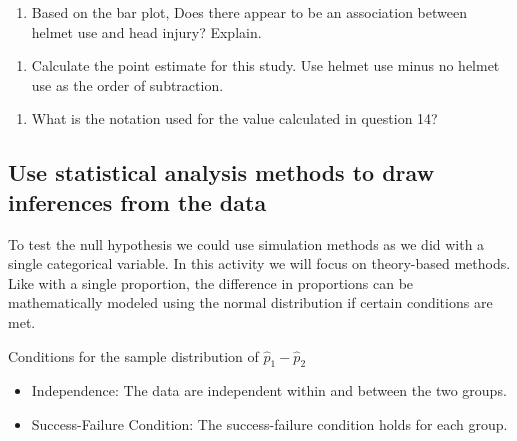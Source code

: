 \documentclass[
]{report}
\providecommand{\tightlist}{%
  \setlength{\itemsep}{0pt}\setlength{\parskip}{0pt}}
\begin{document}
\vspace{0.1in}

\begin{enumerate}
\def\labelenumi{\arabic{enumi}.}
\setcounter{enumi}{12}
\tightlist
\item
  Based on the bar plot, Does there appear to be an association between helmet use and head injury? Explain.
\end{enumerate}

\vspace{1in}

\begin{enumerate}
\def\labelenumi{\arabic{enumi}.}
\setcounter{enumi}{13}
\tightlist
\item
  Calculate the point estimate for this study. Use helmet use minus no helmet use as the order of subtraction.
\end{enumerate}

\vspace{1in}

\begin{enumerate}
\def\labelenumi{\arabic{enumi}.}
\setcounter{enumi}{14}
\tightlist
\item
  What is the notation used for the value calculated in question 14?
\end{enumerate}

\vspace{0.5in}

\hypertarget{use-statistical-analysis-methods-to-draw-inferences-from-the-data}{%
\subsection{Use statistical analysis methods to draw inferences from the data}\label{use-statistical-analysis-methods-to-draw-inferences-from-the-data}}

To test the null hypothesis we could use simulation methods as we did with a single categorical variable. In this activity we will focus on theory-based methods. Like with a single proportion, the difference in proportions can be mathematically modeled using the normal distribution if certain conditions are met.

Conditions for the sample distribution of \(\hat{p}_1-\hat{p}_2\)

\begin{itemize}
\item
  Independence: The data are independent within and between the two groups.
\item
  Success-Failure Condition: The success-failure condition holds for each group.
\end{itemize}
\end{document}
